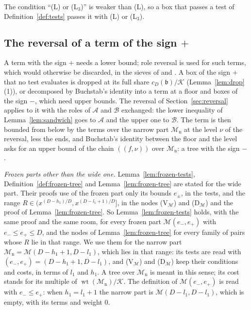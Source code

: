 \documentclass[11pt]{article}
\theoremstyle{definition}
\begin{document}
The condition ``(L) or (L$_3$)'' is weaker than (L), so a box that passes a test of Definition~\ref{def:tests} passes
it with (L) or (L$_3$).

\subsection{The reversal of a term of the sign \texorpdfstring{$+$}{+}}\label{sec:reversal-plus}

A term with the sign $+$ needs a lower bound; role reversal is used for such terms, which would otherwise be discarded,
in the sieves of \cite{bhp} and \cite{li-harman}. A box of the sign $+$ that no test evaluates is dropped at its full
share
$c_D(\mathfrak b)/\mathcal K$ (Lemma~\ref{lem:drop}(1)), or decomposed by Buchstab's identity into a term at a floor and
boxes of the sign $-$, which need upper bounds. The reversal of Section~\ref{sec:reversal} applies to it with the roles
of $\mathcal A$ and $\mathcal B$ exchanged: the lower inequality of Lemma~\ref{lem:sandwich} goes to $\mathcal A$ and
the upper one to $\mathcal B$. The term is then bounded from below by the terms over the narrow part
$\mathcal M_{\mathrm n}$ at the level $\nu$ of the reversal, less the ends, and Buchstab's identity between the floor
and the level asks for an upper
bound of the chain $((f, \nu))$ over $\mathcal M_{\mathrm n}$: a tree with the sign $-$.

\emph{Frozen parts other than the wide one.} Lemma~\ref{lem:frozen-tests}, Definition~\ref{def:frozen-tree} and
Lemma~\ref{lem:frozen-tree} are stated for the wide part. Their proofs use of the frozen part only its bounds $e_\pm$,
in the tests, and the range $R \in (x^{(D - h_1)/D}, x^{(D - l_1 + 1)/D}]$, in the nodes (V$_{\mathcal M}$) and
(D$_{\mathcal M}$) and the proof of Lemma~\ref{lem:frozen-tree}. So Lemma~\ref{lem:frozen-tests} holds, with the same
proof and the same room, for every frozen part $\mathcal M(e_-, e_+)$ with $e_- \le e_+ \le D$, and the nodes of
Lemma~\ref{lem:frozen-tree} for every family of pairs whose $R$ lie in that range. We use them for the narrow part
$\mathcal M_{\mathrm n} = \mathcal M(D - h_1 + 1, D - l_1)$, which lies in that range: its tests are read with $(e_-,
e_+) = (D - h_1 + 1, D - l_1)$, and (V$_{\mathcal M}$) and (D$_{\mathcal M}$) keep their conditions and costs, in terms
of $l_1$ and $h_1$. A tree over $\mathcal M_{\mathrm n}$ is meant in this sense; its cost stands for its multiple of
$\operatorname{wt}(\mathcal M_{\mathrm n})/\mathcal K$. The definition of $\mathcal M(e_-, e_+)$ is read with $e_- \le
e_+$: when $h_1 = l_1 + 1$ the narrow part is $\mathcal M(D - l_1, D - l_1)$, which is empty, with its terms and weight
$0$.
\end{document}
